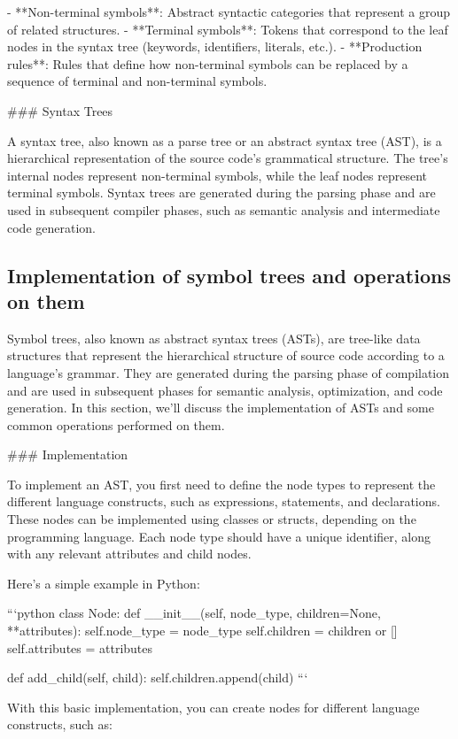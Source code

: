 \documentclass{article}
\begin{document}
- **Non-terminal symbols**: Abstract syntactic categories that represent a group of related structures.
- **Terminal symbols**: Tokens that correspond to the leaf nodes in the syntax tree (keywords, identifiers, literals, etc.).
- **Production rules**: Rules that define how non-terminal symbols can be replaced by a sequence of terminal and non-terminal symbols.

### Syntax Trees

A syntax tree, also known as a parse tree or an abstract syntax tree (AST), is a hierarchical representation of the source code's grammatical structure. The tree's internal nodes represent non-terminal symbols, while the leaf nodes represent terminal symbols. Syntax trees are generated during the parsing phase and are used in subsequent compiler phases, such as semantic analysis and intermediate code generation.


\subsection{Implementation of symbol trees and operations on them}
Symbol trees, also known as abstract syntax trees (ASTs), are tree-like data structures that represent the hierarchical structure of source code according to a language's grammar. They are generated during the parsing phase of compilation and are used in subsequent phases for semantic analysis, optimization, and code generation. In this section, we'll discuss the implementation of ASTs and some common operations performed on them.

### Implementation

To implement an AST, you first need to define the node types to represent the different language constructs, such as expressions, statements, and declarations. These nodes can be implemented using classes or structs, depending on the programming language. Each node type should have a unique identifier, along with any relevant attributes and child nodes.

Here's a simple example in Python:

```python
class Node:
    def __init__(self, node_type, children=None, **attributes):
        self.node_type = node_type
        self.children = children or []
        self.attributes = attributes

    def add_child(self, child):
        self.children.append(child)
```

With this basic implementation, you can create nodes for different language constructs, such as:
\end{document}
